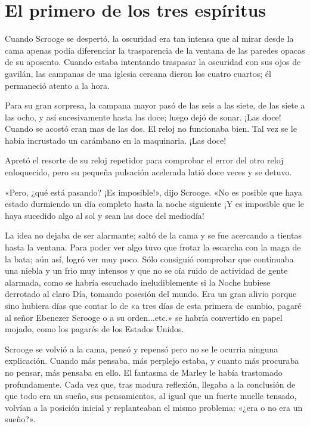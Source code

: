 \documentclass{novela}
\begin{document}
 \chapter{El primero de los tres espíritus}



 Cuando Scrooge se despertó, la oscuridad era tan intensa que al mirar desde la cama apenas podía diferenciar la trasparencia de la ventana de las paredes opacas de su aposento. Cuando estaba intentando traspasar la oscuridad con sus ojos de gavilán, las campanas de una iglesia cercana dieron los cuatro cuartos; él permaneció atento a la hora.

 Para su gran sorpresa, la campana mayor pasó de las seis a las siete, de las siete a las ocho, y así sucesivamente hasta las doce; luego dejó de sonar. ¡Las doce! Cuando se acostó eran mas de las dos. El reloj no funcionaba bien. Tal vez se le había incrustado un carámbano en la maquinaria. ¡Las doce!

 Apretó el resorte de su reloj repetidor para comprobar el error del otro reloj enloquecido, pero su pequeña pulsación acelerada latió doce veces y se detuvo.

 «Pero, ¿qué está pasando? ¡Es imposible!», dijo Scrooge. «No es posible que haya estado durmiendo un día completo hasta la noche siguiente ¡Y es imposible que le haya sucedido algo al sol y sean las doce del mediodía!

 La idea no dejaba de ser alarmante; saltó de la cama y se fue acercando a tientas hasta la ventana. Para poder ver algo tuvo que frotar la escarcha con la maga de la bata; aún así, logró ver muy poco. Sólo consiguió comprobar que continuaba una niebla y un frio muy intensos y que no se oía ruido de actividad de gente alarmada, como se habría escuchado ineludiblemente si la Noche hubiese derrotado al claro Día, tomando posesión del mundo. Era un gran alivio porque sino hubiera días que contar lo de «a tres días de esta primera de cambio, pagaré al señor Ebenezer Scrooge o a su orden...etc.» se habría convertido en papel mojado, como los pagarés de los Estados Unidos.

 Scrooge se volvió a la cama, pensó y repensó pero no se le ocurria ninguna explicación. Cuando más pensaba, más perplejo estaba, y cuanto más procuraba no pensar, más pensaba en ello. El fantasma de Marley le había trastomado profundamente. Cada vez que, tras madura reflexión, llegaba a la conclusión de que todo era un sueño, sus pensamientos, al igual que un fuerte muelle tensado, volvían a la posición inicial y replanteaban el mismo problema: «¿era o no era un sueño?».
\end{document}

